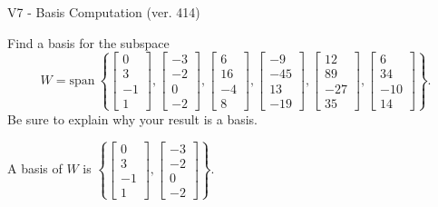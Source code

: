 \begin{exercise}
  \begin{exerciseTitle}V7 - Basis Computation (ver. 414)\end{exerciseTitle}
  \begin{exerciseStatement}
    Find a basis for the subspace 
\[W=\mathrm{span}\ \left\{\left[\begin{array}{r}
0 \\
3 \\
-1 \\
1
\end{array}\right] , \left[\begin{array}{r}
-3 \\
-2 \\
0 \\
-2
\end{array}\right] , \left[\begin{array}{r}
6 \\
16 \\
-4 \\
8
\end{array}\right] , \left[\begin{array}{r}
-9 \\
-45 \\
13 \\
-19
\end{array}\right] , \left[\begin{array}{r}
12 \\
89 \\
-27 \\
35
\end{array}\right] , \left[\begin{array}{r}
6 \\
34 \\
-10 \\
14
\end{array}\right]\right\}.\]
 Be sure to explain why your result is a basis.


  \end{exerciseStatement}
  \begin{exerciseAnswer}
   A basis of \(W\) is  \(\left\{\left[\begin{array}{r}
0 \\
3 \\
-1 \\
1
\end{array}\right] , \left[\begin{array}{r}
-3 \\
-2 \\
0 \\
-2
\end{array}\right]\right\}\).
  


  \end{exerciseAnswer}
\end{exercise}